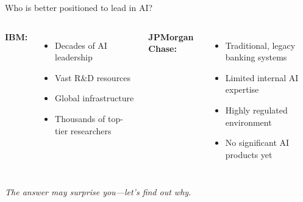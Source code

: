 \documentclass[aspectratio=169]{beamer}
\begin{document}
%
%
%
%
\begin{frame}{Who is better positioned to lead in AI?}
\begin{columns}
\textbf{IBM:}
\begin{itemize}
\item Decades of AI leadership
\item Vast R\&D resources
\item Global infrastructure
\item Thousands of top-tier researchers
\end{itemize}

\textbf{JPMorgan Chase:}
\begin{itemize}
\item Traditional, legacy banking systems
\item Limited internal AI expertise
\item Highly regulated environment
\item No significant AI products yet
\end{itemize}
\end{columns}

\vspace{0.8em}
\emph{The answer may surprise you—let’s find out why.}
\end{frame}
\end{document}
